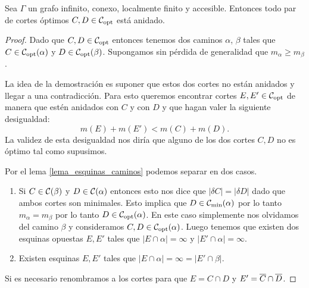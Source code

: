 \documentclass[tesis.tex]{subfiles}
\begin{document}
\begin{teo}\label{teo_copt_anidados}
	Sea $\Gamma$ un grafo infinito, conexo, localmente finito y accesible.
	Entonces todo par de cortes óptimos $C,D \in {\cal C}_{\text{opt}}$ está anidado.
\end{teo}
\begin{proof}
	Dado que $C, D \in {\cal C}_{\text{opt}}$ entonces tenemos dos caminos $\alpha$, $\beta$ tales que $C \in {\cal C}_{\text{opt}}(\alpha)$ y $D \in {\cal C}_{\text{opt}}(\beta)$.
	Supongamos sin pérdida de generalidad que $m_{\alpha} \ge m_{\beta}$.
	
	La idea de la demostración es suponer que estos dos cortes no están anidados y llegar a una contradicción.
	Para esto queremos encontrar cortes $E, E' \in {\cal C}_{\text{opt}}$ de manera que estén anidados con $C$ y con $D$ y que hagan valer la siguiente desigualdad:
	\[
	m(E) + m(E') < m(C) + m(D).
	\]   
	La validez de esta desigualdad nos diría que alguno de los dos cortes $C,D$ no es óptimo tal como supusimos.
	
	Por el lema \ref{lema_esquinas_caminos} podemos separar en dos casos.
	\begin{enumerate}
		\item Si $C \in {\cal C}(\beta)$ y $D \in {\cal C}(\alpha)$ entonces esto nos dice que $|\delta C| = |\delta D|$ dado que ambos cortes son minimales.
		Esto implica que $D \in {\cal C}_{\text{min}}(\alpha)$ por lo tanto $m_{\alpha} = m_{\beta}$ por lo tanto $D \in {\cal C}_{\text{opt}}(\alpha)$. 
		En este caso simplemente nos olvidamos del camino $\beta$ y consideramos $C,D \in {\cal C}_{\text{opt}}(\alpha)$.
		Luego tenemos que existen dos esquinas opuestas $E,E'$ tales que $|E \cap \alpha| = \infty$ y $|E' \cap \alpha| = \infty$.
		\item Existen esquinas $E,E'$ tales que $|E \cap \alpha| = \infty = |E' \cap \beta|$.
	\end{enumerate}	
	
	Si es necesario renombramos a los cortes para que $E = C \cap D$ y $E' = \overline C \cap \overline D$.
	
	
	
%	
%	
	

\end{proof}
\end{document}
